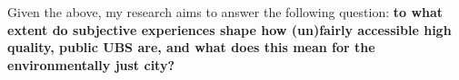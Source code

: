\documentclass{article}
\newcommand{\bisection}[1]{\textbf{\textit{#1}}}
\begin{document}
Given the above, my research aims to answer the following question: \textbf{to what extent do subjective experiences shape how (un)fairly accessible high quality, public UBS are, and what does this mean for the environmentally just city?}


\begin{comment}
\section{Research design}



To answer my research question, I will use the following sub-questions:

\begin{enumerate}
	\item Who are the users of the space, how do they perceive it and how do they feel in it?
	\item Why do they choose to use this space?
	\item How diverse are the users... 
	\item How 
\end{enumerate}

\subsection{Methodology}

Data on perceived accessibility is a subjective measure, based on qualitative data. It cannot be quantified in the same way as physical proximity


\end{comment}
\end{document}
